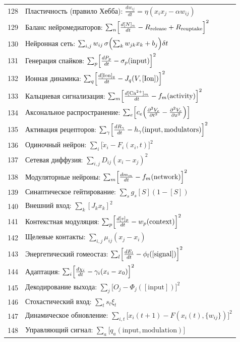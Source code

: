 \documentclass[12pt,a4paper]{article}
\begin{document}
\begin{longtable}{r l}
		128 & Пластичность (правило Хебба): $\frac{dw_{ij}}{dt} = \eta(x_i x_j - \alpha w_{ij})$ \\
		129 & Баланс нейромедиаторов: $\sum_n\Bigl[\frac{d[N]_n}{dt} - R_{\text{release}} + R_{\text{reuptake}}\Bigr]^2$ \\
		130 & Нейронная сеть: $\sum_{i,j} w_{ij}\,\sigma\Bigl(\sum_k w_{jk}x_k + b_j\Bigr)\delta t$ \\
		131 & Генерация спайков: $\sum_p\Bigl[\frac{dP_p}{dt} - \sigma_p(\text{input})\Bigr]^2$ \\
		132 & Ионная динамика: $\sum_q\Bigl[\frac{d[\text{Ion}]_q}{dt} - J_q(V,[\text{Ion}])\Bigr]^2$ \\
		133 & Кальциевая сигнализация: $\sum_m\Bigl[\frac{d[\text{Ca}^{2+}]_m}{dt} - f_m(\text{activity})\Bigr]^2$ \\
		134 & Аксональное распространение: $\sum_e\Bigl[c_e\Bigl(\frac{\partial^2 V_e}{\partial t^2} - \frac{\partial^2 V_e}{\partial x^2}\Bigr)\Bigr]$ \\
		135 & Активация рецепторов: $\sum_\gamma\Bigl[\frac{dR_\gamma}{dt} - h_\gamma(\text{input},\text{modulators})\Bigr]^2$ \\
		136 & Одиночный нейрон: $\sum_i\bigl[\dot x_i - F_i(x_i,t)\bigr]^2$ \\
		137 & Сетевая диффузия: $\sum_{i,j} D_{ij}(x_i - x_j)^2$ \\
		138 & Модуляторные нейроны: $\sum_m\Bigl[\frac{dm_m}{dt} - f_m(\text{network})\Bigr]^2$ \\
		139 & Синаптическое гейтирование: $\sum_s g_s[S](1-[S])$ \\
		140 & Внешний вход: $\sum_k [J_k x_k]^2$ \\
		141 & Контекстная модуляция: $\sum_p\Bigl[\frac{d[v]_p}{dt} - w_p(\text{context})\Bigr]^2$ \\
		142 & Щелевые контакты: $\sum_{i,j}\mu_{ij}(x_j - x_i)$ \\
		143 & Энергетический гомеостаз: $\sum_l\Bigl[\frac{dE_l}{dt} - \phi_l([\text{signal}])\Bigr]^2$ \\
		144 & Адаптация: $\sum_i\Bigl[\frac{d\chi_i}{dt} - \gamma_i(x_i - x_0)\Bigr]^2$ \\
		145 & Декодирование выхода: $\sum_j\bigl[O_j - \Phi_j([\text{input}])\bigr]^2$ \\
		146 & Стохастический вход: $\sum_t s_t\xi_t$ \\
		147 & Динамическое обновление: $\sum_{i,t}\bigl[x_i(t+1) - F(x_i(t),\{w_{ij}\})\bigr]^2$ \\
		148 & Управляющий сигнал: $\sum_a\bigl[q_a(\text{input},\text{modulation})\bigr]$ \\

\end{longtable}
\end{document}
